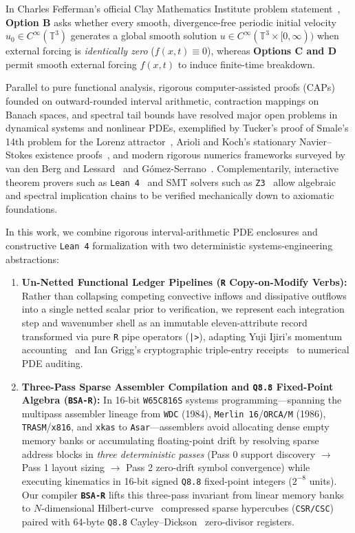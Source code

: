 \documentclass[11pt]{article}
\theoremstyle{plain}
\theoremstyle{definition}
\begin{document}
In Charles Fefferman's official Clay Mathematics Institute problem statement~\cite{fefferman2000}, \textbf{Option B} asks whether every smooth, divergence-free periodic initial velocity $u_0 \in C^\infty(\mathbb{T}^3)$ generates a global smooth solution $u \in C^\infty(\mathbb{T}^3 \times [0,\infty))$ when external forcing is \emph{identically zero} ($f(x,t) \equiv 0$), whereas \textbf{Options C and D} permit smooth external forcing $f(x,t)$ to induce finite-time breakdown.

Parallel to pure functional analysis, rigorous computer-assisted proofs (CAPs) founded on outward-rounded interval arithmetic, contraction mappings on Banach spaces, and spectral tail bounds have resolved major open problems in dynamical systems and nonlinear PDEs, exemplified by Tucker's proof of Smale's 14th problem for the Lorenz attractor~\cite{tucker2002}, Arioli and Koch's stationary Navier--Stokes existence proofs~\cite{ariolikoch2010}, and modern rigorous numerics frameworks surveyed by van den Berg and Lessard~\cite{vdblessard2015} and G\'omez-Serrano~\cite{gomezserrano2019}. Complementarily, interactive theorem provers such as \texttt{Lean 4}~\cite{lean4_2021} and SMT solvers such as \texttt{Z3}~\cite{z3_2008} allow algebraic and spectral implication chains to be verified mechanically down to axiomatic foundations.

In this work, we combine rigorous interval-arithmetic PDE enclosures and constructive \texttt{Lean 4} formalization with two deterministic systems-engineering abstractions:
\begin{enumerate}
  \item \textbf{Un-Netted Functional Ledger Pipelines (\texttt{R} Copy-on-Modify Verbs):} Rather than collapsing competing convective inflows and dissipative outflows into a single netted scalar prior to verification, we represent each integration step and wavenumber shell as an immutable eleven-attribute record transformed via pure \texttt{R} pipe operators (\texttt{|>}), adapting Yuji Ijiri's momentum accounting~\cite{ijiri1989} and Ian Grigg's cryptographic triple-entry receipts~\cite{grigg2005} to numerical PDE auditing.
  \item \textbf{Three-Pass Sparse Assembler Compilation and \texttt{Q8.8} Fixed-Point Algebra (\texttt{BSA-R}):} In 16-bit \texttt{W65C816S} systems programming---spanning the multipass assembler lineage from \texttt{WDC} (1984), \texttt{Merlin 16}/\texttt{ORCA/M} (1986), \texttt{TRASM}/\texttt{x816}, and \texttt{xkas} to \texttt{Asar}---assemblers avoid allocating dense empty memory banks or accumulating floating-point drift by resolving sparse address blocks in \emph{three deterministic passes} (Pass 0 support discovery $\to$ Pass 1 layout sizing $\to$ Pass 2 zero-drift symbol convergence) while executing kinematics in 16-bit signed \texttt{Q8.8} fixed-point integers ($2^{-8}$ units). Our compiler \textbf{\texttt{BSA-R}} lifts this three-pass invariant from linear memory banks to $N$-dimensional Hilbert-curve~\cite{hilbert1891} compressed sparse hypercubes (\texttt{CSR/CSC}) paired with 64-byte \texttt{Q8.8} Cayley--Dickson~\cite{dickson1919,moreno1998,demarrais2000} zero-divisor registers.
\end{enumerate}
\end{document}

